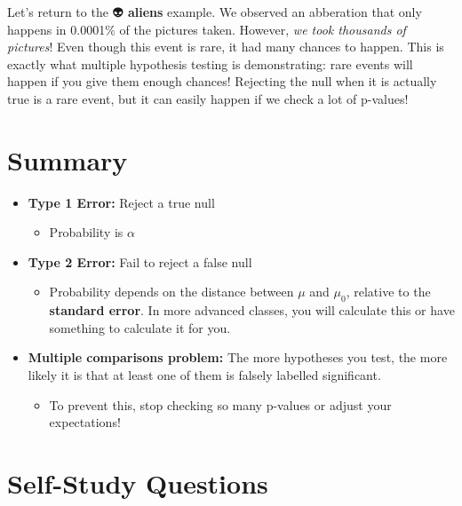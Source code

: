 \documentclass[
  letterpaper,
  DIV=11,
  numbers=noendperiod]{scrreprt}
\providecommand{\tightlist}{%
  \setlength{\itemsep}{0pt}\setlength{\parskip}{0pt}}\usepackage{longtable,booktabs,array}
\begin{document}
Let's return to the 👽 \textbf{aliens} example. We observed an
abberation that only happens in 0.0001\% of the pictures taken. However,
\emph{we took thousands of pictures}! Even though this event is rare, it
had many chances to happen. This is exactly what multiple hypothesis
testing is demonstrating: rare events will happen if you give them
enough chances! Rejecting the null when it is actually true is a rare
event, but it can easily happen if we check a lot of p-values!

\hypertarget{summary-5}{%
\section{Summary}\label{summary-5}}

\begin{itemize}
\tightlist
\item
  \textbf{Type 1 Error:} Reject a true null

  \begin{itemize}
  \tightlist
  \item
    Probability is \(\alpha\)
  \end{itemize}
\item
  \textbf{Type 2 Error:} Fail to reject a false null

  \begin{itemize}
  \tightlist
  \item
    Probability depends on the distance between \(\mu\) and \(\mu_0\),
    relative to the \textbf{standard error}. In more advanced classes,
    you will calculate this or have something to calculate it for you.
  \end{itemize}
\item
  \textbf{Multiple comparisons problem:} The more hypotheses you test,
  the more likely it is that at least one of them is falsely labelled
  significant.

  \begin{itemize}
  \tightlist
  \item
    To prevent this, stop checking so many p-values or adjust your
    expectations!
  \end{itemize}
\end{itemize}

\hypertarget{self-study-questions-4}{%
\section{Self-Study Questions}\label{self-study-questions-4}}
\end{document}
